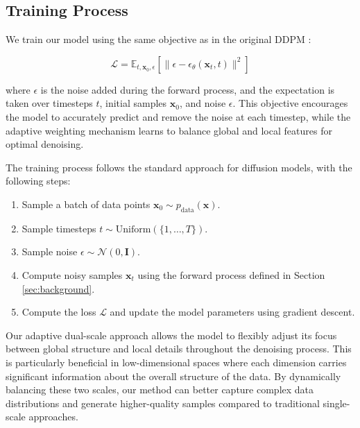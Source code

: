 \documentclass{article} %
\begin{document}
\subsection{Training Process}
We train our model using the same objective as in the original DDPM \cite{ddpm}:

\begin{equation}
    \mathcal{L} = \mathbb{E}_{t, \mathbf{x}_0, \epsilon}\left[\|\epsilon - \epsilon_\theta(\mathbf{x}_t, t)\|^2\right]
\end{equation}

where $\epsilon$ is the noise added during the forward process, and the expectation is taken over timesteps $t$, initial samples $\mathbf{x}_0$, and noise $\epsilon$. This objective encourages the model to accurately predict and remove the noise at each timestep, while the adaptive weighting mechanism learns to balance global and local features for optimal denoising.

The training process follows the standard approach for diffusion models, with the following steps:
\begin{enumerate}
    \item Sample a batch of data points $\mathbf{x}_0 \sim p_{\text{data}}(\mathbf{x})$.
    \item Sample timesteps $t \sim \text{Uniform}(\{1, \ldots, T\})$.
    \item Sample noise $\epsilon \sim \mathcal{N}(0, \mathbf{I})$.
    \item Compute noisy samples $\mathbf{x}_t$ using the forward process defined in Section \ref{sec:background}.
    \item Compute the loss $\mathcal{L}$ and update the model parameters using gradient descent.
\end{enumerate}

Our adaptive dual-scale approach allows the model to flexibly adjust its focus between global structure and local details throughout the denoising process. This is particularly beneficial in low-dimensional spaces where each dimension carries significant information about the overall structure of the data. By dynamically balancing these two scales, our method can better capture complex data distributions and generate higher-quality samples compared to traditional single-scale approaches.
\end{document}
